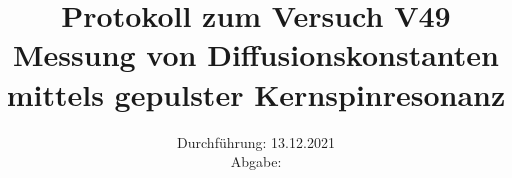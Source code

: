 \titlehead{\texttt{[image: resources/logo.jpg]}}
\title{Protokoll zum Versuch V49 \\ Messung von Diffusionskonstanten mittels gepulster Kernspinresonanz }
\date{Durchführung: 13.12.2021 \\ Abgabe:  }

